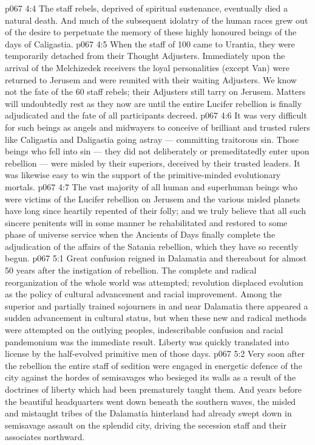 \vs p067 4:4 The staff rebels, deprived of spiritual sustenance, eventually died a natural death. And much of the subsequent idolatry of the human races grew out of the desire to perpetuate the memory of these highly honoured beings of the days of Caligastia.
\vs p067 4:5 When the staff of 100 came to Urantia, they were temporarily detached from their Thought Adjusters. Immediately upon the arrival of the Melchizedek receivers the loyal personalities (except Van) were returned to Jerusem and were reunited with their waiting Adjusters. We know not the fate of the 60 staff rebels; their Adjusters still tarry on Jerusem. Matters will undoubtedly rest as they now are until the entire Lucifer rebellion is finally adjudicated and the fate of all participants decreed.
\vs p067 4:6 \pc It was very difficult for such beings as angels and midwayers to conceive of brilliant and trusted rulers like Caligastia and Daligastia going astray --- committing traitorous sin. Those beings who fell into sin --- they did not deliberately or premeditatedly enter upon rebellion --- were misled by their superiors, deceived by their trusted leaders. It was likewise easy to win the support of the primitive\hyp{}minded evolutionary mortals.
\vs p067 4:7 The vast majority of all human and superhuman beings who were victims of the Lucifer rebellion on Jerusem and the various misled planets have long since heartily repented of their folly; and we truly believe that all such sincere penitents will in some manner be rehabilitated and restored to some phase of universe service when the Ancients of Days finally complete the adjudication of the affairs of the Satania rebellion, which they have so recently begun.
\vs p067 5:1 Great confusion reigned in Dalamatia and thereabout for almost 50 years after the instigation of rebellion. The complete and radical reorganization of the whole world was attempted; revolution displaced evolution as the policy of cultural advancement and racial improvement. Among the superior and partially trained sojourners in and near Dalamatia there appeared a sudden advancement in cultural status, but when these new and radical methods were attempted on the outlying peoples, indescribable confusion and racial pandemonium was the immediate result. Liberty was quickly translated into license by the half\hyp{}evolved primitive men of those days.
\vs p067 5:2 Very soon after the rebellion the entire staff of sedition were engaged in energetic defence of the city against the hordes of semisavages who besieged its walls as a result of the doctrines of liberty which had been prematurely taught them. And years before the beautiful headquarters went down beneath the southern waves, the misled and mistaught tribes of the Dalamatia hinterland had already swept down in semisavage assault on the splendid city, driving the secession staff and their associates northward.

